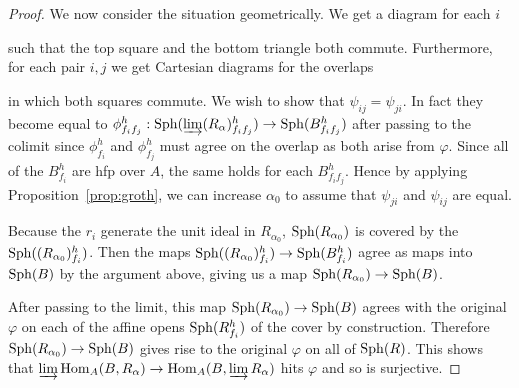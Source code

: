\documentclass[12pt]{article}
\newcommand{\sph}{{\rm Sph}}
\newcommand{\Hom}{{\rm Hom}}
\newcommand{\colim}{\varinjlim}
\newcommand{\vp}{\varphi}
\newcommand{\hfp}{hfp\xspace}
\theoremstyle{definition}
\numberwithin{equation}{subsection}
\begin{document}
\begin{proof}
We now consider the situation geometrically. We get a diagram for each $i$

\begin{center}
\end{center} \vspace{-.25in}

such that the top square and the bottom triangle both commute. Furthermore, for each pair $i,j$ we get Cartesian diagrams for the overlaps

\begin{center}
\end{center} \vspace{-.1in}

in which both squares commute. We wish to show that $\psi_{ij}=\psi_{ji}$.  In fact they become equal to $\phi_{f_if_j}^h: \sph(\colim (R_\alpha)_{f_if_j}^h) \to \sph(B_{f_if_j}^h)$ after passing to the colimit since $\phi_{f_i}^h$ and $\phi_{f_j}^h$ must agree on the overlap as both arise from $\vp$. Since all of the $B_{f_i}^h$ are \hfp over $A$, the same holds for each $B_{f_if_j}^h$. Hence by applying Proposition~\ref{prop:groth}, we can increase $\alpha_0$ to assume that $\psi_{ji}$ and $\psi_{ij}$ are equal. 


Because the $r_i$ generate the unit ideal in $R_{\alpha_0}$, $\sph(R_{\alpha_0})$ is covered by the $\sph((R_{\alpha_0})_{f_i}^h)$. Then the maps $ \sph((R_{\alpha_0})_{f_i}^h) \to \sph(B_{f_i}^h)$ agree as maps into $\sph(B)$ by the argument above, giving us a map $\sph(R_{\alpha_0}) \to \sph(B) $. 

After passing to the limit, this map $\sph(R_{\alpha_0}) \to \sph(B) $ agrees with the original $\vp$ on each of the affine opens $\sph(R_{f_i}^h)$ of the cover by construction. Therefore $\sph(R_{\alpha_0}) \to \sph(B) $ gives rise to the original $\vp$ on all of $\sph(R)$. This shows that $\colim \Hom_A(B,R_\alpha) \to \Hom_A(B,\colim R_\alpha)$ hits $\vp$ and so is surjective.


\end{proof}
\end{document}
